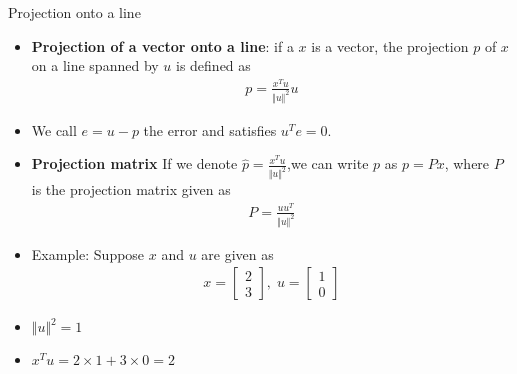 \begin{frame}{Projection onto a line}
\begin{itemize}
    \item \textbf{Projection of a vector onto a line}: if a $x$ is a vector, the projection $p$ of $x$ on a line spanned by $u$ is  defined as 
    \begin{align}
        p = \frac{x^T u}{\Vert u \Vert ^2}u
    \end{align}
    \item We call $e=u-p$ the error and satisfies $u^Te=0$.
    \item \textbf{Projection matrix}  If we denote $\hat{p}=\frac{x^Tu}{\Vert u \Vert^2}$,we can write $p$ as $p=Px$, where $P$ is the projection matrix given as  
    \begin{align}
        P = \frac{uu^T}{\Vert u \Vert^2} 
    \end{align}
 \end{itemize}
\end{frame}
\begin{frame}{}
\begin{center}
\end{center}
\begin{itemize}
\item Example: Suppose $x$ and $u$ are given as 
    \begin{align*}
        x = \begin{bmatrix}
            2\\3
        \end{bmatrix}, \; u =\begin{bmatrix}
            1\\0
        \end{bmatrix}
    \end{align*}
    \item $\Vert u \Vert ^2 = 1$
    \item $x^T u = 2\times 1 + 3\times 0 = 2$
\end{itemize}
\end{frame}
